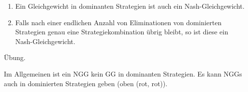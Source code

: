 \begin{satz}
\renewcommand{\labelenumi}{(\alph{enumi})}
  \begin{enumerate}
  \item Ein Gleichgewicht in dominanten Strategien ist auch ein Nash-Gleichgewicht. 
\item Falls nach einer endlichen Anzahl von Eliminationen von dominierten Strategien genau eine Strategiekombination übrig bleibt, so ist diese ein Nash-Gleichgewicht. 
  \end{enumerate}
\end{satz}
\begin{beweis}
  Übung.
\end{beweis}
\begin{bemerkung*}
  Im Allgemeinen ist ein NGG kein GG in dominanten Strategien. Es kann NGGs auch in dominierten Strategien geben (oben (rot, rot)). 
\end{bemerkung*}

